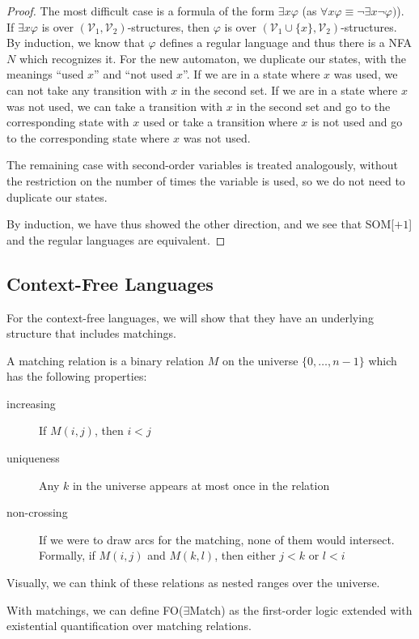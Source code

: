 \begin{proof}
    The most difficult case is a formula of the form $\exists x \varphi$ (as $\forall x \varphi \equiv \neg \exists x \neg \varphi)$).
    If $\exists x \varphi$ is over $(\mathcal{V}_1, \mathcal{V}_2)$-structures, then $\varphi$ is over $(\mathcal{V}_1 \cup \{x\}, \mathcal{V}_2)$-structures.
    By induction, we know that $\varphi$ defines a regular language and thus there is a NFA $N$ which recognizes it.
    For the new automaton, we duplicate our states, with the meanings ``used $x$'' and ``not used $x$''.
    If we are in a state where $x$ was used, we can not take any transition with $x$ in the second set.
    If we are in a state where $x$ was not used, we can take a transition with $x$ in the second set and go to the corresponding state with $x$ used or take a transition where $x$ is not used and go to the corresponding state where $x$ was not used.

    The remaining case with second-order variables is treated analogously, without the restriction on the number of times the variable is used, so we do not need to duplicate our states.

    By induction, we have thus showed the other direction, and we see that SOM[$+ 1$] and the regular languages are equivalent.
\end{proof}

\subsection{Context-Free Languages}\label{subsec:des-context-free-languages}

For the context-free languages, we will show that they have an underlying structure that includes matchings.

A matching relation is a binary relation $M$ on the universe $\{0, \dots, n - 1\}$ which has the following properties:
\begin{description}
    \item[increasing] If $M(i, j)$, then $i < j$
    \item[uniqueness] Any $k$ in the universe appears at most once in the relation
    \item[non-crossing] If we were to draw arcs for the matching, none of them would intersect.
    Formally, if $M(i, j)$ and $M(k, l)$, then either $j < k$ or $l < i$
\end{description}
Visually, we can think of these relations as nested ranges over the universe.

With matchings, we can define FO($\exists$Match) as the first-order logic extended with existential quantification over matching relations.

